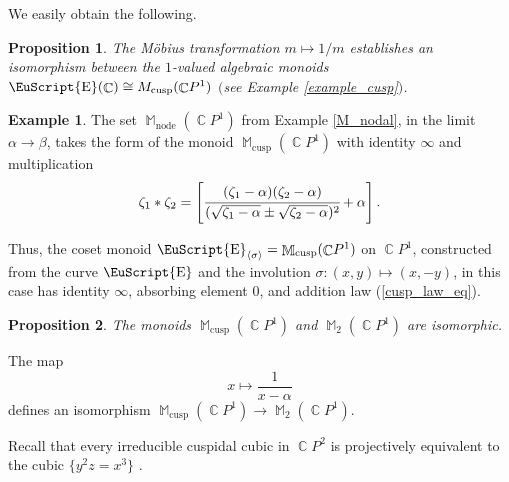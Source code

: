 \documentclass[14pt, dvipsnames]{extarticle}
\makeatletter
\theoremstyle{plain}
\newtheorem{prop}{Proposition}
\theoremstyle{definition}
\newtheorem{example}{\bf Example}
\theoremstyle{remark}
\renewenvironment{proof}[1][\proofname]{
  \par\pushQED{\qed}\normalfont
  \topsep6\p@\@plus6\p@\relax
  \trivlist\item[\hskip\labelsep\bfseries\itshape #1\@addpunct{.}]
}{\popQED\endtrivlist\@endpefalse}
\DeclareMathOperator{\E}{\EuScript{E}}
\DeclareMathOperator{\Cc}{\mathbb{C}}
\DeclareMathOperator{\M}{\mathbb{M}}
\DeclareMathOperator{\node}{\mathrm{node}}
\DeclareMathOperator{\cusp}{\mathrm{cusp}}
\makeatother
\begin{document}
We easily obtain the following.

\begin{prop}\label{E_cong_G_m_cups_case}
The Möbius transformation $m\mapsto 1/m$ establishes an isomorphism between the $1$-valued algebraic monoids $\E(\Cc)\cong M_{\cusp}(\Cc\!P^1)$ $($see Example {\normalfont\ref{example_cusp}}$)$.
\end{prop}

\begin{example}\label{example_3}
The set $\M_{\node}(\Cc\!P^1)$ from Example \ref{M_nodal}, in the limit $\alpha\to\beta$, takes the form of the monoid $\M_{\cusp}(\Cc\!P^1)$ with identity $\infty$ and multiplication
\begin{equation}\label{cusp_law_eq}
\zeta_1\ast \zeta_2 = \left[\cfrac{(\zeta_1-\alpha)(\zeta_2-\alpha)}{(\sqrt{\zeta_1-\alpha} \pm \sqrt{\zeta_2-\alpha})^2} + \alpha\right].
\end{equation}
\end{example}

Thus, the coset monoid $\E_{\langle\sigma \rangle} = \M_{\cusp}(\Cc\!P^1)$ on $\Cc\!P^1$, constructed from the curve $\E$ and the involution $\sigma: (x, y)\mapsto (x, -y)$, in this case has identity $\infty$, absorbing element $0$, and addition law (\ref{cusp_law_eq}). 

\begin{prop}
The monoids $\M_{\cusp}(\Cc\!P^1)$ and $\M_2(\Cc\!P^1)$ are isomorphic.
\end{prop}

\begin{proof}
The map
$$x\mapsto \frac{1}{x - \alpha}$$
defines an isomorphism $\M_{\cusp}(\Cc\!P^1)\to\M_2(\Cc\!P^1)$.  
\end{proof}

Recall that every irreducible cuspidal cubic in $\Cc\!P^2$ is projectively equivalent to the cubic $\{y^2z = x^3\}$ \cite[Exercise 5-24]{Fulton}. 
\end{document}
